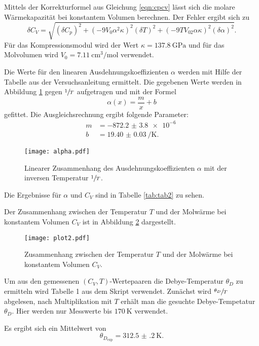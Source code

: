 Mittels der Korrekturformel aus Gleichung \ref{eqn:cpcv}
lässt sich die molare Wärmekapazität bei konstantem Volumen berechnen.
Der Fehler ergibt sich zu
\begin{equation}
  \delta C_V=\sqrt{(\delta C_p)^2 +(-9V_0 \alpha^2 \kappa)^2(\delta T)^2 +(-9TV_02\alpha\kappa)^2(\delta \alpha)^2}.
\end{equation}
Für das Kompressionsmodul wird der Wert $\kappa=\SI{137.8}{\giga\Pa}$ \cite{kompress}
und für das Molvolumen wird $V_0=\SI{7.11}{\cm^3\per\mol}$
\cite{mol} verwendet.

Die Werte für den linearen Ausdehnungskoeffizienten $\alpha$
werden mit Hilfe der Tabelle aus der Versuchsanleitung \cite{skript} ermittelt.
Die gegebenen Werte werden in Abbildung \ref{fig:alpha} gegen $\sfrac{1}{T}$
aufgetragen und mit der Formel
\begin{equation}
  \alpha(x)= \frac{m}{x}+b
\end{equation}
gefittet. Die Ausgleichsrechnung ergibt folgende Parameter:
\begin{align}
  m &= \SI{-872.2(38)e-6}{}\\
  b &= \SI{19.40(3)}{\per\K}.
\end{align}
\begin{figure}[H]
  \centering
  \texttt{[image: alpha.pdf]}
  \caption{Linearer Zusammenhang des Ausdehnungskoeffizienten $\alpha$ mit der
  inversen Temperatur $\sfrac{1}{T}$.}
  \label{fig:alpha}
\end{figure}

Die Ergebnisse für $\alpha$ und $C_V$ sind in Tabelle \ref{tab:tab2} zu sehen.


Der Zusammenhang zwischen der Temperatur $T$ und der Molwärme bei konstantem Volumen
$C_V$ ist in Abbildung \ref{fig:Cv} dargestellt.

\begin{figure}[H]
  \centering
  \texttt{[image: plot2.pdf]}
  \caption{Zusammenhang zwischen der Temperatur $T$ und der Molwärme bei konstantem Volumen
  $C_V$.}
  \label{fig:Cv}
\end{figure}

Um aus den gemessenen $(C_V, T)$-Wertepaaren die Debye-Temperatur $\theta_D$ zu ermitteln
wird Tabelle 1 aus dem Skript \cite{skript} verwendet. Zunächst wird $\sfrac{\theta_D}{T}$\;
abgelesen, nach Multiplikation mit $T$ erhält man die gesuchte Debye-Tempetatur $\theta_D$.
Hier werden nur Messwerte bis $\SI{170}{\K}$ verwendet.

Es ergibt sich ein Mittelwert von
\begin{equation}
  \theta_{D_\text{exp}}=\SI{312.5(2)}{\K}.
\end{equation}


